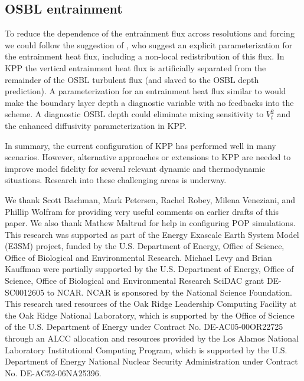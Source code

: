 \documentclass[preprint,12pt,authoryear]{agujournal}
\begin{document}
\subsection{OSBL entrainment}
\label{sec:futureEntrainment}

To reduce the dependence of the entrainment flux across resolutions and forcing we could follow the suggestion of \cite{Noh2003}, who suggest an explicit parameterization for the entrainment heat flux, including a non-local redistribution of this flux.  In KPP the vertical entrainment heat flux is artificially separated from the remainder of the OSBL turbulent flux (and slaved to the OSBL depth prediction).  A parameterization for an entrainment heat flux similar to \cite{Noh2003} would make the boundary layer depth a diagnostic variable with no feedbacks into the scheme.  A diagnostic OSBL depth could eliminate mixing sensitivity to $V_t^2$ and the enhanced diffusivity parameterization in KPP.  

In summary, the current configuration of KPP has performed well in many scenarios.  However,  alternative approaches or extensions to KPP are needed to improve model fidelity for several relevant dynamic and thermodynamic situations.   Research into these challenging areas is underway.

\acknowledgments
We thank Scott Bachman, Mark Petersen, Rachel Robey, Milena Veneziani, and Phillip Wolfram for providing very useful comments on earlier drafts of this paper.  We also thank Mathew Maltrud for help in configuring POP simulations.  This research was supported as part of the Energy Exascale Earth System Model (E3SM) project, funded by the U.S. Department of Energy, Office of Science, Office of Biological and Environmental Research.  Michael Levy and Brian Kauffman were partially supported by the U.S. Department of Energy, Office of Science, Office of Biological and Environmental Research SciDAC grant DE-SC0012605 to NCAR. NCAR is sponsored by the National Science Foundation.  This research used resources of the Oak Ridge Leadership Computing Facility at the Oak Ridge National Laboratory, which is supported by the Office of Science of the U.S. Department of Energy under Contract No. DE-AC05-00OR22725 through an ALCC allocation and resources provided by the Los Alamos National Laboratory Institutional Computing Program, which is supported by the U.S. Department of Energy National Nuclear Security Administration under Contract No. DE-AC52-06NA25396.


\appendix
\newpage 
\end{document}
